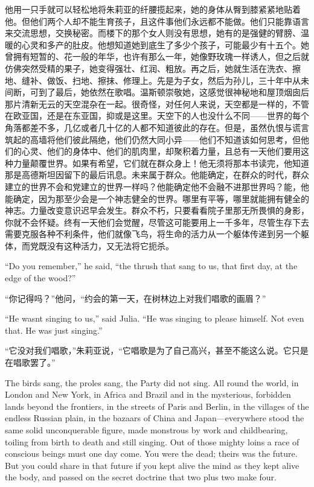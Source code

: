 \begin{paracol}{2}
他用一只手就可以轻松地将朱莉亚的纤腰揽起来，她的身体从臀到膝紧紧地贴着他。但他们两个人却不能生育孩子，且这件事他们永远都不能做。他们只能靠语言来交流思想，交换秘密。而楼下的那个女人则没有思想，她有的是强健的臂膀、温暖的心灵和多产的肚皮。他想知道她到底生了多少个孩子，可能最少有十五个。她曾拥有短暂的、花一般的年华，也许有那么一年，她像野玫瑰一样诱人，但之后就仿佛突然受精的果子，她变得强壮、红润、粗放。再之后，她就生活在洗衣、擦地、缝补、做饭、扫地、擦抹、修理上。先是为子女，然后为孙儿，三十年中从未间断，可到了最后，她依然在歌唱。温斯顿崇敬她，这感觉很神秘地和屋顶烟囱后那片清新无云的天空混杂在一起。很奇怪，对任何人来说，天空都是一样的，不管在欧亚国，还是在东亚国，抑或是这里。天空下的人也没什么不同——世界的每个角落都差不多，几亿或者几十亿的人都不知道彼此的存在。但是，虽然仇恨与谎言筑起的高墙将他们彼此隔绝，他们仍然大同小异——他们不知道该如何思考，但他们的心灵、他们的身体中、他们的肌肉里，却聚积着力量，且总有一天他们要用这种力量颠覆世界。如果有希望，它们就在群众身上！他无须将那本书读完，他知道那是高德斯坦因留下的最后讯息。未来属于群众。他能确定，在群众的时代，群众建立的世界不会和党建立的世界一样吗？他能确定他不会融不进那世界吗？能，他能确定，因为那至少会是一个神志健全的世界。哪里有平等，哪里就能拥有健全的神志。力量改变意识迟早会发生。群众不朽，只要看看院子里那无所畏惧的身影，你就不会怀疑。终有一天他们会觉醒，尽管这可能要用上一千多年，尽管生存下去需要克服各种不利条件，他们就像飞鸟，将生命的活力从一个躯体传递到另一个躯体，而党既没有这种活力，又无法将它扼杀。

\switchcolumn*

``Do you remember,'' he said, ``the thrush that sang to us, that first day,
at the edge of the wood?''

\switchcolumn

``你记得吗？''他问，``约会的第一天，在树林边上对我们唱歌的画眉？''

\switchcolumn*

``He wasn\textquotesingle t singing to us,'' said Julia. ``He was singing
to please himself. Not even that. He was just singing.''

\switchcolumn

``它没对我们唱歌，''朱莉亚说，``它唱歌是为了自己高兴，甚至不能这么说。它只是在唱歌罢了。''

\switchcolumn*

The birds sang, the proles sang, the Party did not sing. All round the
world, in London and New York, in Africa and Brazil and in the
mysterious, forbidden lands beyond the frontiers, in the streets of
Paris and Berlin, in the villages of the endless Russian plain, in the
bazaars of China and Japan---everywhere stood the same solid
unconquerable figure, made monstrous by work and childbearing, toiling
from birth to death and still singing. Out of those mighty loins a race
of conscious beings must one day come. You were the dead; theirs was the
future. But you could share in that future if you kept alive the mind as
they kept alive the body, and passed on the secret doctrine that two
plus two make four.


\end{paracol}
